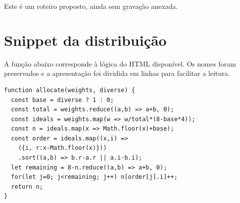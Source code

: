 \documentclass[12pt,a4paper]{article}
\begin{document}
Este é um roteiro proposto, ainda sem gravação anexada.
\section{Snippet da distribuição}\label{ap:codigo}
A função abaixo corresponde à lógica do HTML disponível. Os nomes foram preservados e a apresentação foi dividida em linhas para facilitar a leitura.
\begin{lstlisting}
function allocate(weights, diverse) {
  const base = diverse ? 1 : 0;
  const total = weights.reduce((a,b) => a+b, 0);
  const ideals = weights.map(w => w/total*(8-base*4));
  const n = ideals.map(x => Math.floor(x)+base);
  const order = ideals.map((x,i) =>
    ({i, r:x-Math.floor(x)}))
    .sort((a,b) => b.r-a.r || a.i-b.i);
  let remaining = 8-n.reduce((a,b) => a+b, 0);
  for(let j=0; j<remaining; j++) n[order[j].i]++;
  return n;
}
\end{lstlisting}
\end{document}
